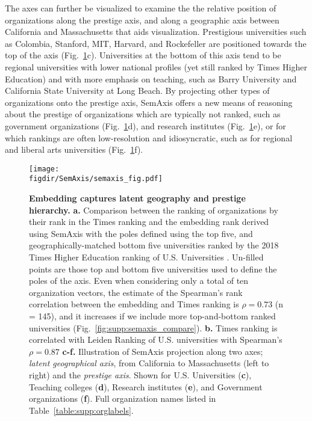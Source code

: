 \documentclass[12pt]{article} %
\def\figdir{../Figs}
\begin{document}
The axes can further be visualized to examine the the relative position of organizations along the prestige axis, and along a geographic axis between California and Massachusetts that aids visualization.
Prestigious universities such as Colombia, Stanford, MIT, Harvard, and Rockefeller are positioned towards the top of the axis (Fig.~\ref{fig:semaxis}c).
Universities at the bottom of this axis tend to be regional universities with lower national profiles (yet still ranked by Times Higher Education) and with more emphasis on teaching, such as Barry University and California State University at Long Beach.
By projecting other types of organizations onto the prestige axis, SemAxis offers a new means of reasoning about the prestige of organizations which are typically not ranked, such as government organizations (Fig.~\ref{fig:semaxis}d), and research institutes (Fig.~\ref{fig:semaxis}e), or for which rankings are often low-resolution and idiosyncratic, such as for regional and liberal arts universities (Fig.~\ref{fig:semaxis}f).

%
%
\begin{figure}[hp!]
	\centering
	\texttt{[image: \\figdir/SemAxis/semaxis\_fig.pdf]}
	\caption{
		\textbf{Embedding captures latent geography and prestige hierarchy.}
		\textbf{a.} Comparison between the ranking of organizations by their rank in the Times ranking and the embedding rank derived using SemAxis with the poles defined using the top five, and geographically-matched bottom five universities ranked by the 2018 Times Higher Education ranking of U.S. Universities .
		Un-filled points are those top and bottom five universities used to define the poles of the axis.
	  	Even when considering only a total of ten organization vectors, the estimate of the Spearman's rank correlation between the embedding and Times ranking is $\rho = 0.73$ (n = 145), and it increases if we include more top-and-bottom ranked universities (Fig.~\ref{fig:supp:semaxis_compare}).
	  	\textbf{b.} Times ranking is correlated with Leiden Ranking of U.S. universities with Spearman's $\rho = 0.87$
		\textbf{c-f.} Illustration of SemAxis projection along two axes;  \textit{latent geographical axis}, from California to Massachusetts (left to right) and the \textit{prestige axis}.
		Shown for U.S. Universities (\textbf{c}), Teaching colleges (\textbf{d}), Research institutes (\textbf{e}), and Government organizations (\textbf{f}).
		Full organization names listed in Table~\ref{table:supp:orglabels}.
	}
	\label{fig:semaxis}
\end{figure}
\end{document}
